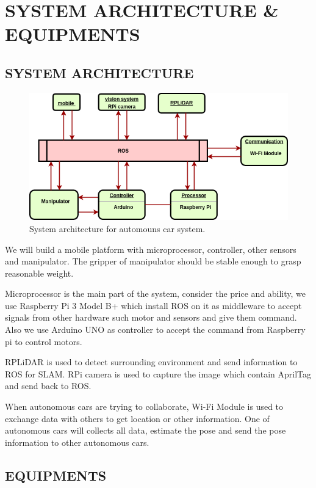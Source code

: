 \documentclass[a4paper, 10pt, conference]{ieeeconf}      %
\begin{document}
\section{SYSTEM ARCHITECTURE \& EQUIPMENTS}
\subsection{SYSTEM ARCHITECTURE}

\begin{figure}[h]
\includegraphics[width=0.95\columnwidth]{system_architecture}
\centering
\caption{System architecture for automouns car system.}
\end{figure}

We will build a mobile platform with microprocessor, controller, other sensors and manipulator. The gripper of manipulator should be stable enough to grasp reasonable weight. 

Microprocessor is the main part of the system, consider the price and ability, we use Raspberry Pi 3 Model B+ which install ROS on it as middleware to accept signals from other hardware such motor and sensors and give them command. Also we use Arduino UNO as controller to accept the command from Raspberry pi to control motors.

RPLiDAR is used to detect surrounding environment and send information to ROS for SLAM. RPi camera is used to capture the image which contain AprilTag and send back to ROS.

When autonomous cars are trying to collaborate, Wi-Fi Module is used to exchange data with others to get location or other information. One of  autonomous cars will collects all data, estimate the pose and send the pose information to other autonomous cars.



\subsection{EQUIPMENTS} 
\end{document}
